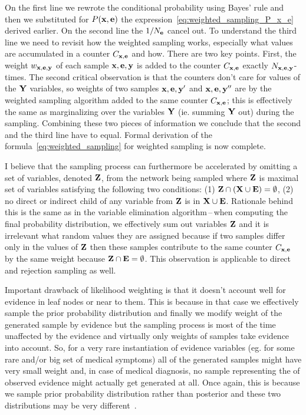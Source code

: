 \documentclass[english,cover]{fitthesis} %
\newcommand{\vars}[1]{{\bold{#1}}}         %
\begin{document}
On the first line we rewrote the conditional probability using Bayes' rule and then we substituted for $P(\vars{x},\vars{e})$ the expression~\eqref{eq:weighted_sampling_P_x_e} derived earlier.
On the second line the $1/N_\vars{e}$ cancel out.
To understand the third line we need to revisit how the weighted sampling works, especially what values are accumulated in a counter $C_{\vars{x},\vars{e}}$ and how. There are two key points. First, the weight $w_{\vars{x},\vars{e},\vars{y}}$ of each sample $\vars{x},\vars{e},\vars{y}$ is added to the counter $C_{\vars{x},\vars{e}}$ exactly $N_{\vars{x},\vars{e},\vars{y}}$-times. The second critical observation is that the counters don't care for values of the $\vars{Y}$ variables, so weights of two samples $\vars{x},\vars{e},\vars{y'}$ and $\vars{x},\vars{e},\vars{y''}$ are by the weighted sampling algorithm added to the same counter $C_{\vars{x},\vars{e}}$; this is effectively the same as marginalizing over the variables $\vars{Y}$ (ie. summing $\vars{Y}$ out) during the sampling.
  Combining these two pieces of information we conclude that the second and the third line have to equal. Formal derivation of the formula~\eqref{eq:weighted_sampling} for weighted sampling is now complete.

\medskip

I believe that the sampling process can furthermore be accelerated by omitting a set of variables, denoted $\vars{Z}$, from the network being sampled where $\vars{Z}$ is maximal set of variables satisfying the following two conditions: (1) $\vars{Z} \cap (\vars{X} \cup \vars{E}) = \emptyset$, (2) no direct or indirect child of any variable from $\vars{Z}$ is in $\vars{X} \cup \vars{E}$. Rationale behind this is the same as in the variable elimination algorithm\,--\,when computing the final probability distribution, we effectively sum out variables $\vars{Z}$ and it is irrelevant what random values they are assigned because if two samples differ only in the values of $\vars{Z}$ then these samples contribute to the same counter $C_{\vars{x},\vars{e}}$ by the same weight because $\vars{Z} \cap \vars{E} = \emptyset$. This observation is applicable to direct and rejection sampling as well.

Important drawback of likelihood weighting is that it doesn't account well for evidence in leaf nodes or near to them. This is because in that case we effectively sample the prior probability distribution and finally we modify weight of the generated sample by evidence but the sampling process is most of the time unaffected by the evidence and virtually only weights of samples take evidence into account. So, for a very rare instantiation of evidence variables (eg. for some rare and/or big set of medical symptoms) all of the generated samples might have very small weight and, in case of medical diagnosis, no sample representing the  of observed evidence might actually get generated at all. Once again, this is because we sample prior probability distribution rather than posterior and these two distributions may be very different~\cite[p.~503]{pgm}.
\end{document}
